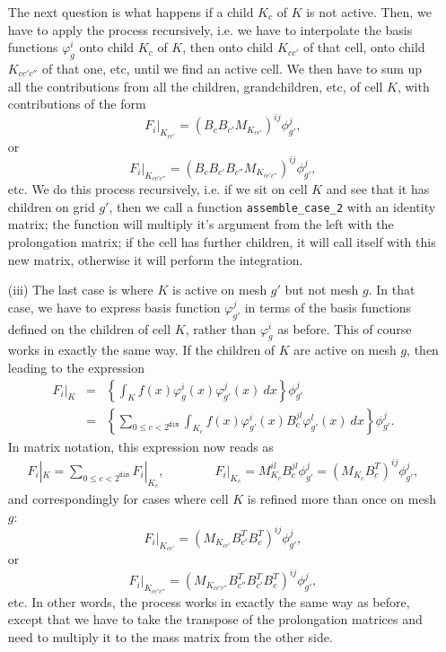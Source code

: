 \documentclass{article}
\begin{document}
\begin{itemize}
  The next question is what happens if a child $K_c$ of $K$ is not
  active. Then, we have to apply the process recursively, i.e. we have to
  interpolate the basis functions $\varphi_g^i$ onto child $K_c$ of $K$, then
  onto child $K_{cc'}$ of that cell, onto child $K_{cc'c''}$ of that one, etc,
  until we find an active cell. We then have to sum up all the contributions
  from all the children, grandchildren, etc, of cell $K$, with contributions
  of the form
  \begin{equation}
    F_i|_{K_{cc'}} = (B_cB_{c'} M_{K_{cc'}})^{ij}  \phi_{g'}^j,
  \end{equation}
  or
  \begin{equation}
    F_i|_{K_{cc'c''}} = (B_c B_{c'} B_{c''}M_{K_{cc'c''}})^{ij}
    \phi_{g'}^j,
  \end{equation}
  etc. We do this process recursively, i.e. if we sit on cell $K$ and see that
  it has children on grid $g'$, then we call a function
  \texttt{assemble\_case\_2} with an identity matrix; the function will
  multiply it's argument from the left with the prolongation matrix; if the
  cell has further children, it will call itself with this new matrix,
  otherwise it will perform the integration.

\item[(iii)] The last case is where $K$ is active on mesh $g'$ but not mesh
  $g$. In that case, we have to express basis function $\varphi_{g'}^j$ in
  terms of the basis functions defined on the children of cell $K$, rather
  than $\varphi_g^i$ as before. This of course works in exactly the same
  way. If the children of $K$ are active on mesh $g$, then
  leading to the expression
  \begin{eqnarray*}
    F_i|_K
    &=&
    \left\{ \int_K f(x) \varphi_g^i(x) \varphi_{g'}^j(x) 
    \ dx \right\} \phi_{g'}^j 
    \\
    &=&
    \left\{
    \sum_{0\le c<2^{\texttt{dim}}}
    \int_{K_c} f(x) \varphi_{g'}^i(x) B_c^{jl} \varphi_{g'}^l(x) 
    \ dx \right\} \phi_{g'}^j.
  \end{eqnarray*}
  In matrix notation, this expression now reads as
  \begin{eqnarray*}
    F_i|_K
    =
    \sum_{0\le c<2^{\texttt{dim}}}
    F_i|_{K_c},
    \qquad
    \qquad
    F_i|_{K_c} = M_{K_c}^{il} B_c^{jl}  \phi_{g'}^j
    =
    (M_{K_c} B_c^T)^{ij} \phi_{g'}^j,
  \end{eqnarray*}
  and correspondingly for cases where cell $K$ is refined more than once on
  mesh $g$:
  \begin{equation}
    F_i|_{K_{cc'}} = (M_{K_{cc'}} B_{c'}^T B_c^T)^{ij}  \phi_{g'}^j,
  \end{equation}
  or
  \begin{equation}
    F_i|_{K_{cc'c''}} = (M_{K_{cc'c''}} B_{c''}^T B_{c'}^T B_c^T)^{ij}
    \phi_{g'}^j,
  \end{equation}
  etc. In other words, the process works in exactly the same way as before,
  except that we have to take the transpose of the prolongation matrices and
  need to multiply it to the mass matrix from the other side. 
\end{itemize}
\end{document}
